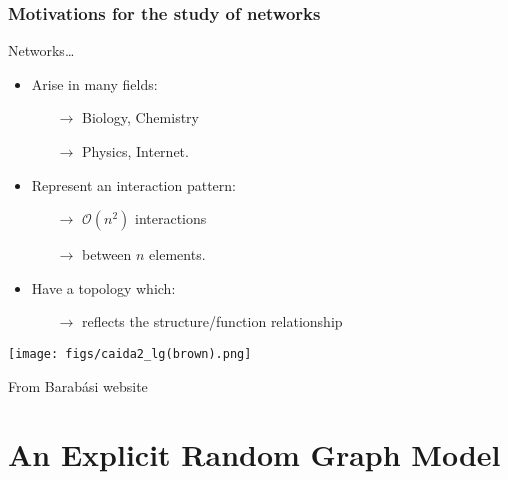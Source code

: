 \documentclass{beamer}
\begin{document}
\begin{frame}
\frametitle{Motivations for the study of networks}
\begin{minipage}{.55\linewidth}
Networks\dots
\begin{itemize}
\item Arise in many fields:
\begin{itemize}
\item[\bf{$\rightarrow$}] Biology, Chemistry
\item[\bf{$\rightarrow$}] Physics, Internet.
\end{itemize}
\item Represent an interaction pattern:
\begin{itemize}
\item[\bf{$\rightarrow$}] $\mathcal{O}(n^2)$ interactions
\item[\bf{$\rightarrow$}] between $n$ elements.
\end{itemize}
\item Have a topology which:
\begin{itemize}
\item[\bf{$\rightarrow$}] reflects the structure/function
relationship
\end{itemize}
\end{itemize}
\end{minipage}%
\begin{minipage}{0.45\linewidth}
\begin{center}
\texttt{[image: figs/caida2\_lg(brown).png]}

\begin{tiny} From Barab\'asi website \end{tiny}
\end{center}
\end{minipage}
\end{frame}

\section{An Explicit Random Graph Model}

\end{document}

